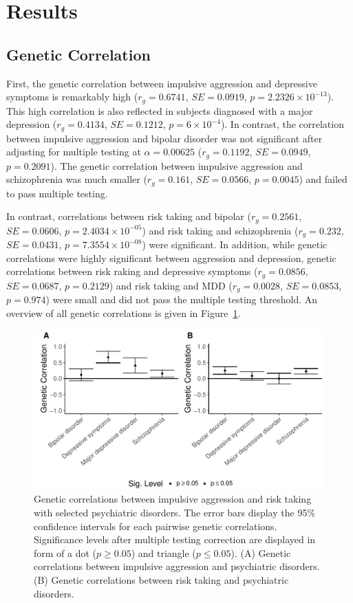 \section{Results}
\label{sec:results_psych}

\subsection{Genetic Correlation}
\label{sub:psych_genetic_correlation}

First, the genetic correlation between impulsive aggression and depressive symptoms is remarkably high ($r_g=0.6741$, $SE=0.0919$, $p=2.2326\times 10^{-13}$).
This high correlation is also reflected in subjects diagnosed with a major depression ($r_g=0.4134$, $SE=0.1212$, $p=6\times 10^{-4}$).
In contrast, the correlation between impulsive aggression and bipolar disorder was not significant after adjusting for multiple testing at $\alpha=0.00625$ ($r_g=0.1192$, $SE=0.0949$, $p=0.2091$).
The genetic correlation between impulsive aggression and  schizophrenia was much smaller ($r_g=0.161$, $SE=0.0566$, $p=0.0045$) and failed to pass multiple testing.

In contrast, correlations between risk taking and bipolar ($r_g=0.2561$, $SE=0.0606$, $p=2.4034\times 10^{-05}$) and risk taking and schizophrenia ($r_g=0.232$, $SE=0.0431$, $p=7.3554\times 10^{-08}$) were significant.
In addition, while genetic correlations were highly significant between aggression and depression, genetic correlations between risk raking and depressive symptoms ($r_g=0.0856$, $SE=0.0687$, $p=0.2129$) and risk taking and  MDD ($r_g=0.0028$, $SE=0.0853$, $p=0.974$) were small and did not pass the multiple testing threshold. An  overview of all genetic correlations is given in Figure~\ref{fig:genetic_correlations_psych}.
\begin{figure}[htpb]
  \centering
  \includegraphics[width=0.8\linewidth]{ukb_psychiatric/figures/combined_corr.pdf}
  \caption[Genetic Correlations with psychiatric disorders]{Genetic correlations between impulsive aggression and risk taking with selected psychiatric disorders.
    The error bars display the 95\% confidence intervals for each pairwise genetic correlations.
    Significance levels after multiple testing correction are displayed in form of a dot ($p\ge 0.05$) and triangle ($p\leq0.05$).
    (A) Genetic correlations between impulsive aggression and psychiatric disorders. 
    (B) Genetic correlations between risk taking and psychiatric disorders.
  }\label{fig:genetic_correlations_psych}
\end{figure}


